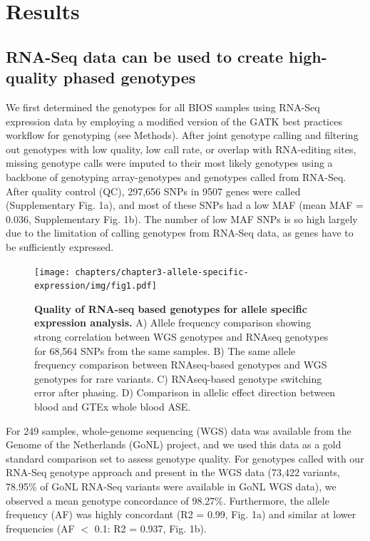 \section{Results}
\subsection{RNA-Seq data can be used to create high-quality phased genotypes}
We first determined the genotypes for all BIOS samples using RNA-Seq expression data by employing a modified version of the GATK\cite{mckennaGenomeAnalysisToolkit2010} best practices workflow for genotyping (see Methods). After joint genotype calling and filtering out genotypes with low quality, low call rate, or overlap with RNA-editing sites, missing genotype calls were imputed to their most likely genotypes using a backbone of genotyping array-genotypes and genotypes called from RNA-Seq. After quality control (QC), 297,656 SNPs in 9507 genes were called (Supplementary Fig. 1a), and most of these SNPs had a low MAF (mean MAF = 0.036, Supplementary Fig. 1b). The number of low MAF SNPs is so high largely due to the limitation of calling genotypes from RNA-Seq data, as genes have to be sufficiently expressed.

\begin{figure}[h!]
	\texttt{[image: chapters/chapter3-allele-specific-expression/img/fig1.pdf]}
	\caption{\textbf{Quality of RNA-seq based genotypes for allele specific expression analysis.} A) Allele frequency comparison showing strong correlation between WGS genotypes and RNAseq genotypes for 68,564 SNPs from the same samples. B) The same allele frequency comparison between RNAseq-based genotypes and WGS genotypes for rare variants. C) RNAseq-based genotype switching error after phasing. D) Comparison in allelic effect direction between blood and GTEx whole blood ASE. }
\end{figure}

For 249 samples, whole-genome sequencing (WGS) data was available from the Genome of the Netherlands (GoNL) project\cite{boomsmaGenomeNetherlandsDesign2014}, and we used this data as a gold standard comparison set to assess genotype quality. For genotypes called with our RNA-Seq genotype approach and present in the WGS data (73,422 variants, 78.95\% of GoNL RNA-Seq variants were available in GoNL WGS data), we observed a mean genotype concordance of 98.27\%. Furthermore, the allele frequency (AF) was highly concordant (R2 = 0.99, Fig. 1a) and similar at lower frequencies (AF $<$ 0.1: R2 = 0.937, Fig. 1b). 


